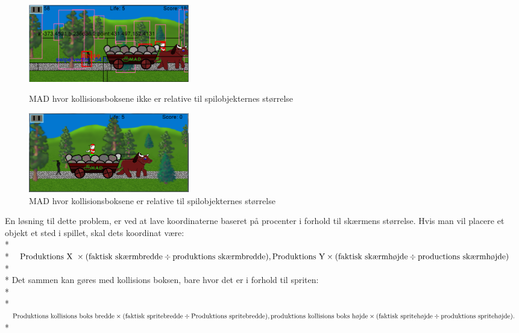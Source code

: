 \documentclass[Main.tex]{PositionOgSkalering}
\begin{document}
\begin{figure}[h]
\centering
\parbox{7cm}{   
\includegraphics[width = 7cm]{billeder/MADscaling5}
\caption{MAD hvor kollisionsboksene ikke er relative til spilobjekternes størrelse}    
\label{MADscaling5}}
\qquad
\begin{minipage}{7cm}
\includegraphics[width = 7cm]{billeder/MADscaling6}
\caption{MAD hvor kollisionsboksene er relative til spilobjekternes størrelse}    
\label{MADscaling6}
\end{minipage}
\end{figure}

En løsning til dette problem, er ved at lave koordinaterne baseret på procenter i forhold til skærmens størrelse. Hvis man vil placere et objekt et sted i spillet, skal dets koordinat være: \\*\\*
\begin{math}
\text{Produktions X } \times (\text{faktisk skærmbredde} \div \text{produktions skærmbredde}), \\*
\text{Produktions Y} \times (\text{faktisk skærmhøjde} \div \text{productions skærmhøjde})\end{math} \\* \\*
Det sammen kan gøres med kollisions boksen, bare hvor det er i forhold til spriten:\\*\\*
\begin{math}\text{Produktions kollisions boks bredde} \times (\text{faktisk spritebredde} \div \text{Produktions spritebredde}),\\*
\text{produktions kollisions boks højde} \times (\text{faktisk spritehøjde} \div \text{produktions spritehøjde}).  \end{math}\\*
\end{document}
